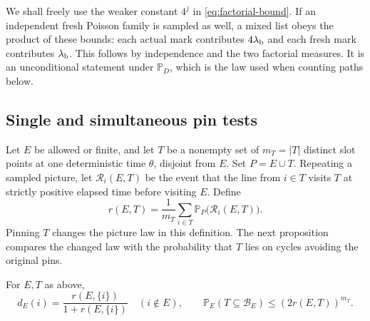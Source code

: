 We shall freely use the weaker constant $4^j$ in
\eqref{eq:factorial-bound}.  If an independent fresh Poisson family is
sampled as well, a mixed
list obeys the product of these bounds: each actual mark contributes
$4\lambda_{\rm b}$ and each fresh mark contributes
$\lambda_{\rm b}$.  This follows by independence and the two factorial
measures.  It is an unconditional statement under $\mathbb P_D$,
which is the law used when counting paths below.

\subsection{Single and simultaneous pin tests}

Let $E$ be allowed or finite, and let $T$ be a nonempty set of
$m_T=|T|$ distinct slot points at one deterministic time $\theta$,
disjoint from $E$.  Set $P=E\cup T$.  Repeating a sampled picture,
let $\mathcal R_i(E,T)$ be the event that the line from $i\in T$
visits $T$ at strictly positive elapsed time before visiting $E$.
Define
\begin{equation}\label{eq:pin-return-fraction}
 r(E,T)=\frac1{m_T}\sum_{i\in T}
                    \mathbb P_P\bigl(\mathcal R_i(E,T)\bigr).
\end{equation}
Pinning $T$ changes the picture law in this definition.  The next
proposition compares the changed law with the probability that $T$
lies on cycles avoiding the original pins.

\begin{proposition}\label{prop:pin-identities}
For $E,T$ as above,
\begin{equation}\label{eq:pin-identities}
 d_E(i)=\frac{r(E,\{i\})}{1+r(E,\{i\})}\quad(i\notin E),
 \qquad
 \mathbb P_E(T\subseteq\mathcal B_E)\le(2r(E,T))^{m_T}.
\end{equation}
\end{proposition}

